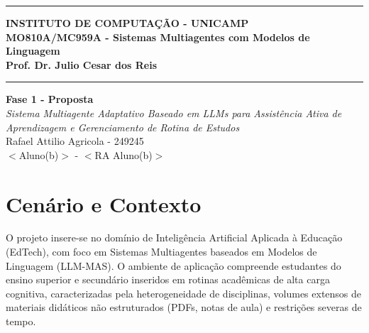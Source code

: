 \documentclass[12pt]{article}
\renewcommand{\headrulewidth}{0pt} %
\begin{document}
\vspace{5mm}
\hrule

\vspace{3mm}

\begin{center}
    {\large\textbf{INSTITUTO DE COMPUTAÇÃO - UNICAMP}} \\
    \vspace{3mm}
    {\large\textbf{MO810A/MC959A - Sistemas Multiagentes com Modelos de Linguagem}} \\
    \vspace{3mm}
    {\large\textbf{Prof. Dr. Julio Cesar dos Reis}}
\end{center}

\vspace{3mm}
\hrule

\vspace{2.5cm}
\begin{flushright}
    \Large{\textbf{Fase 1 - Proposta}} \\
    \vspace{1cm}
    \textit{
        Sistema Multiagente Adaptativo Baseado em LLMs para Assistência Ativa de Aprendizagem e Gerenciamento de Rotina de Estudos \\
    }
    \vspace{5cm}
    Rafael Attilio Agricola - 249245 \\
    $<$Aluno(b)$>$ - $<$RA Aluno(b)$>$
\end{flushright}



\newpage
\pagestyle{fancy} %
\fancyhf{} %
\renewcommand{\headrulewidth}{0pt} %

\fancyfoot[R]{\thepage}



\section{Cenário e Contexto}
\label{sec:contexto}
O projeto insere-se no domínio de Inteligência Artificial Aplicada à Educação (EdTech), com foco em Sistemas Multiagentes baseados em Modelos de Linguagem (LLM-MAS). O ambiente de aplicação compreende estudantes do ensino superior e secundário inseridos em rotinas acadêmicas de alta carga cognitiva, caracterizadas pela heterogeneidade de disciplinas, volumes extensos de materiais didáticos não estruturados (PDFs, notas de aula) e restrições severas de tempo.
\end{document}

